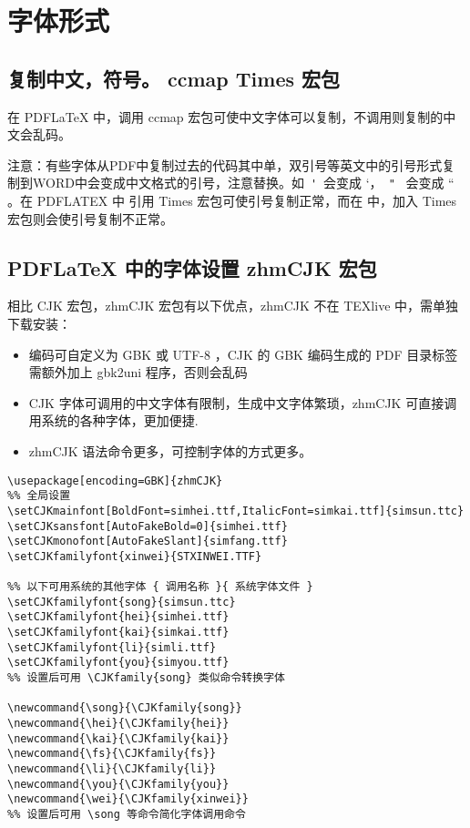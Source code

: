 \section{字体形式}
\subsection{复制中文，符号。 ccmap Times 宏包}
\color{red}
在 PDFLaTeX 中，调用 ccmap 宏包可使中文字体可以复制，不调用则复制的中文会乱码。

注意：有些字体从PDF中复制过去的代码其中单，双引号等英文中的引号形式复制到WORD中会变成中文格式的引号，注意替换。如~\verb|'|~会变成 ‘，~\verb|"|~  会变成 “ 。在 PDFLATEX 中 引用 Times 宏包可使引号复制正常，而在 \XeLaTeX 中，加入 Times 宏包则会使引号复制不正常。
\normalcolor

\subsection{PDFLaTeX 中的字体设置 zhmCJK 宏包}
相比 CJK 宏包，zhmCJK 宏包有以下优点，zhmCJK 不在 TEXlive 中，需单独下载安装：
\begin{itemize}
  \item 编码可自定义为 GBK 或 UTF-8 ，CJK 的 GBK 编码生成的 PDF 目录标签需额外加上 gbk2uni 程序，否则会乱码
  \item CJK 字体可调用的中文字体有限制，生成中文字体繁琐，zhmCJK 可直接调用系统的各种字体，更加便捷.
  \item zhmCJK 语法命令更多，可控制字体的方式更多。
\end{itemize}
\begin{lstlisting}[language={[LaTeX]TeX}]
%% 编码可为 UTF8( 默认 ),BG5,GBK
\usepackage[encoding=GBK]{zhmCJK}  
%% 全局设置
\setCJKmainfont[BoldFont=simhei.ttf,ItalicFont=simkai.ttf]{simsun.ttc}
\setCJKsansfont[AutoFakeBold=0]{simhei.ttf}
\setCJKmonofont[AutoFakeSlant]{simfang.ttf}
\setCJKfamilyfont{xinwei}{STXINWEI.TTF}

%% 以下可用系统的其他字体 { 调用名称 }{ 系统字体文件 }
\setCJKfamilyfont{song}{simsun.ttc}
\setCJKfamilyfont{hei}{simhei.ttf}
\setCJKfamilyfont{kai}{simkai.ttf}
\setCJKfamilyfont{li}{simli.ttf}
\setCJKfamilyfont{you}{simyou.ttf}
%% 设置后可用 \CJKfamily{song} 类似命令转换字体

\newcommand{\song}{\CJKfamily{song}}
\newcommand{\hei}{\CJKfamily{hei}}
\newcommand{\kai}{\CJKfamily{kai}}
\newcommand{\fs}{\CJKfamily{fs}}
\newcommand{\li}{\CJKfamily{li}}
\newcommand{\you}{\CJKfamily{you}}
\newcommand{\wei}{\CJKfamily{xinwei}}
%% 设置后可用 \song 等命令简化字体调用命令
\end{lstlisting}
